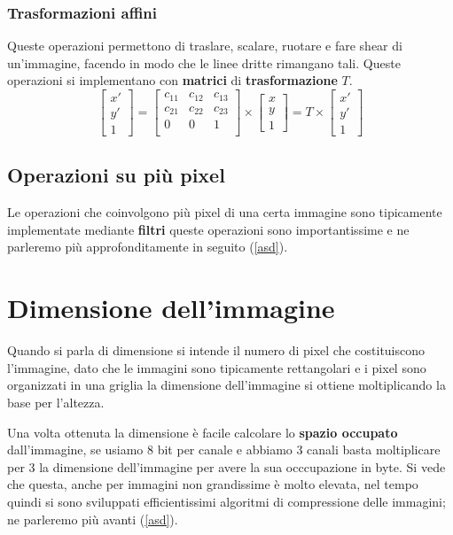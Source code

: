 \subsubsection{Trasformazioni affini}
Queste operazioni permettono di traslare, scalare, ruotare e fare shear di un'immagine, facendo in modo che le linee dritte rimangano tali. Queste operazioni si implementano con \textbf{matrici} di \textbf{trasformazione} $T$.
\begin{equation}
	\begin{bmatrix}
		x'\\
		y'\\
		1
	\end{bmatrix}
	= 
	\begin{bmatrix}
		c_{11} & c_{12} & c_{13} \\
		c_{21} & c_{22} & c_{23} \\
		0 & 0 & 1 \\
	\end{bmatrix}
	\times
	\begin{bmatrix}
		x\\
		y\\
		1
	\end{bmatrix}
	= T \times
	\begin{bmatrix}
		x'\\
		y'\\
		1
	\end{bmatrix}
\end{equation}
\subsection{Operazioni su più pixel}
Le operazioni che coinvolgono più pixel di una certa immagine sono tipicamente implementate mediante \textbf{filtri} queste operazioni sono importantissime e ne parleremo più approfonditamente in seguito (\ref{asd}).

\section{Dimensione dell'immagine}\label{sec:image_dimension}
Quando si parla di dimensione si intende il numero di pixel che costituiscono l'immagine, dato che le immagini sono tipicamente rettangolari e i pixel sono organizzati in una griglia la dimensione dell'immagine si ottiene moltiplicando la base per l'altezza.

Una volta ottenuta la dimensione è facile calcolare lo \textbf{spazio occupato} dall'immagine, se usiamo 8 bit per canale e abbiamo 3 canali basta moltiplicare per 3 la dimensione dell'immagine per avere la sua occcupazione in byte. Si vede che questa, anche per immagini non grandissime è molto elevata, nel tempo quindi si sono sviluppati efficientissimi algoritmi di compressione delle immagini; ne parleremo più avanti (\ref{asd}).
